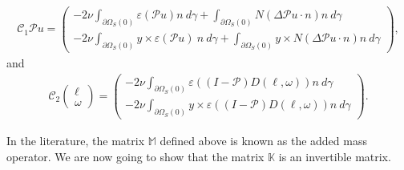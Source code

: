 \documentclass[12pt,a4paper,reqno]{amsart}
\theoremstyle{definition}
\theoremstyle{remark}
\numberwithin{equation}{section}
\newcommand{\oso}{\Omega_{S}(0)}
\newcommand{\ds}{\displaystyle}
\newcommand{\poso}{\partial\oso}
\newcommand{\mpp}{\mathcal{P}}
\begin{document}
\begin{align}
\mathcal{C}_{1} \mpp u = \begin{pmatrix}
\ds -2\nu \int_{\poso} \varepsilon(\mpp u)n \ d\gamma + \int_{\partial\oso} N (\Delta \mpp u \cdot n) n \ d\gamma \\
\ds  -2\nu \int_{\poso} y \times \varepsilon(\mpp u) \ n \ d\gamma + \int_{\partial\oso}  y \times  N (\Delta \mpp u \cdot n)  n \ d\gamma
\end{pmatrix},
\end{align}
and
\begin{align}
\mathcal{C}_{2} \begin{pmatrix}
\ell \\ \omega
\end{pmatrix} =  \begin{pmatrix}
- \ds 2\nu \int_{\poso} \varepsilon((I - \mpp) D(\ell,\omega))n \ d\gamma \\
- \ds 2\nu \int_{\poso} y\times \varepsilon((I - \mpp) D(\ell,\omega))n \ d\gamma
\end{pmatrix}.
\end{align}


In the literature, the matrix $\mathbb{M}$ defined above  is known as the added mass operator. We are now going to show that the matrix $\mathbb{K}$  is an invertible matrix.
\end{document}
